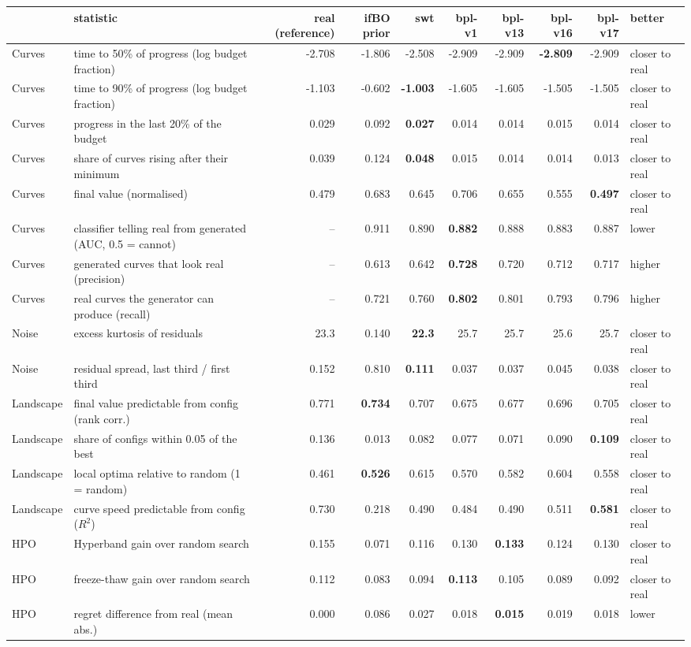 \begin{tabular}{llrrrrrrrl}
\toprule
 & statistic & \textbf{real (reference)} & ifBO prior & swt & bpl-v1 & bpl-v13 & bpl-v16 & bpl-v17 & better \\
\midrule
Curves & time to 50\% of progress (log budget fraction) & -2.708 & -1.806 & -2.508 & -2.909 & -2.909 & \textbf{-2.809} & -2.909 & closer to real \\
Curves & time to 90\% of progress (log budget fraction) & -1.103 & -0.602 & \textbf{-1.003} & -1.605 & -1.605 & -1.505 & -1.505 & closer to real \\
Curves & progress in the last 20\% of the budget & 0.029 & 0.092 & \textbf{0.027} & 0.014 & 0.014 & 0.015 & 0.014 & closer to real \\
Curves & share of curves rising after their minimum & 0.039 & 0.124 & \textbf{0.048} & 0.015 & 0.014 & 0.014 & 0.013 & closer to real \\
Curves & final value (normalised) & 0.479 & 0.683 & 0.645 & 0.706 & 0.655 & 0.555 & \textbf{0.497} & closer to real \\
Curves & classifier telling real from generated (AUC, 0.5 = cannot) & -- & 0.911 & 0.890 & \textbf{0.882} & 0.888 & 0.883 & 0.887 & lower \\
Curves & generated curves that look real (precision) & -- & 0.613 & 0.642 & \textbf{0.728} & 0.720 & 0.712 & 0.717 & higher \\
Curves & real curves the generator can produce (recall) & -- & 0.721 & 0.760 & \textbf{0.802} & 0.801 & 0.793 & 0.796 & higher \\
\midrule
Noise & excess kurtosis of residuals & 23.3 & 0.140 & \textbf{22.3} & 25.7 & 25.7 & 25.6 & 25.7 & closer to real \\
Noise & residual spread, last third / first third & 0.152 & 0.810 & \textbf{0.111} & 0.037 & 0.037 & 0.045 & 0.038 & closer to real \\
\midrule
Landscape & final value predictable from config (rank corr.) & 0.771 & \textbf{0.734} & 0.707 & 0.675 & 0.677 & 0.696 & 0.705 & closer to real \\
Landscape & share of configs within 0.05 of the best & 0.136 & 0.013 & 0.082 & 0.077 & 0.071 & 0.090 & \textbf{0.109} & closer to real \\
Landscape & local optima relative to random (1 = random) & 0.461 & \textbf{0.526} & 0.615 & 0.570 & 0.582 & 0.604 & 0.558 & closer to real \\
Landscape & curve speed predictable from config ($R^2$) & 0.730 & 0.218 & 0.490 & 0.484 & 0.490 & 0.511 & \textbf{0.581} & closer to real \\
\midrule
HPO & Hyperband gain over random search & 0.155 & 0.071 & 0.116 & 0.130 & \textbf{0.133} & 0.124 & 0.130 & closer to real \\
HPO & freeze-thaw gain over random search & 0.112 & 0.083 & 0.094 & \textbf{0.113} & 0.105 & 0.089 & 0.092 & closer to real \\
HPO & regret difference from real (mean abs.) & 0.000 & 0.086 & 0.027 & 0.018 & \textbf{0.015} & 0.019 & 0.018 & lower \\
\bottomrule
\end{tabular}
